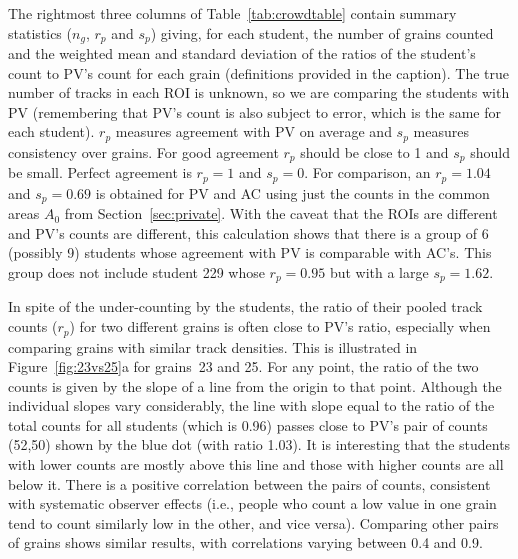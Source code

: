 \documentclass[gchron, manuscript]{copernicus}
\begin{document}
The rightmost three columns of Table~\ref{tab:crowdtable} contain
summary statistics ($n_g$, $r_p$ and $s_p$) giving, for each student,
the number of grains counted and the weighted mean and standard
deviation of the ratios of the student's count to PV's count for each
grain (definitions provided in the caption). The true number of tracks
in each ROI is unknown, so we are comparing the students with PV
(remembering that PV's count is also subject to error, which is the
same for each student). $r_p$ measures agreement with PV on average
and $s_p$ measures consistency over grains. For good agreement $r_p$
should be close to 1 and $s_p$ should be small.  Perfect agreement is
$r_p = 1$ and $s_p = 0$. For comparison, an $r_p = 1.04$ and $s_p =
0.69$ is obtained for PV and AC using just the counts in the common
areas $A_0$ from Section~\ref{sec:private}. With the caveat that the
ROIs are different and PV's counts are different, this calculation
shows that there is a group of 6 (possibly 9) students whose agreement
with PV is comparable with AC's. This group does not include student
229 whose $r_p = 0.95$ but with a large $s_p = 1.62$.\medskip

In spite of the under-counting by the students, the ratio of their
pooled track counts ($r_p$) for two different grains is often close to
PV's ratio, especially when comparing grains with similar track
densities. This is illustrated in Figure~\ref{fig:23vs25}a for
grains~23 and 25.  For any point, the ratio of the two counts is given
by the slope of a line from the origin to that point. Although the
individual slopes vary considerably, the line with slope equal to the
ratio of the total counts for all students (which is 0.96) passes
close to PV's pair of counts (52,50) shown by the blue dot (with ratio
1.03). It is interesting that the students with lower counts are
mostly above this line and those with higher counts are all below it.
There is a positive correlation between the pairs of counts,
consistent with systematic observer effects (i.e., people who count a
low value in one grain tend to count similarly low in the other, and
vice versa). Comparing other pairs of grains shows similar results,
with correlations varying between 0.4 and 0.9.\medskip
\end{document}
